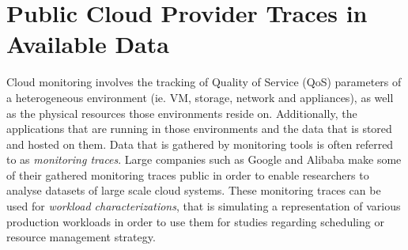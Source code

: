 






    \section{Public Cloud Provider Traces in Available Data}
    \label{sec:public-cloud-provider-traces-in-available-data-related-work}

        Cloud monitoring involves the tracking of Quality of Service (QoS) parameters of a heterogeneous environment (ie. VM, storage, network and appliances), as well as the physical resources those environments reside on. Additionally, the applications that are running in those environments and the data that is stored and hosted on them.
        Data that is gathered by monitoring tools is often referred to as \emph{monitoring traces}.
        Large companies such as Google and Alibaba make some of their gathered monitoring traces public in order to enable researchers to analyse datasets of large scale cloud systems.
        These monitoring traces can be used for \emph{workload characterizations}, that is simulating a representation of various production workloads in order to use them for studies regarding scheduling or resource management strategy.

